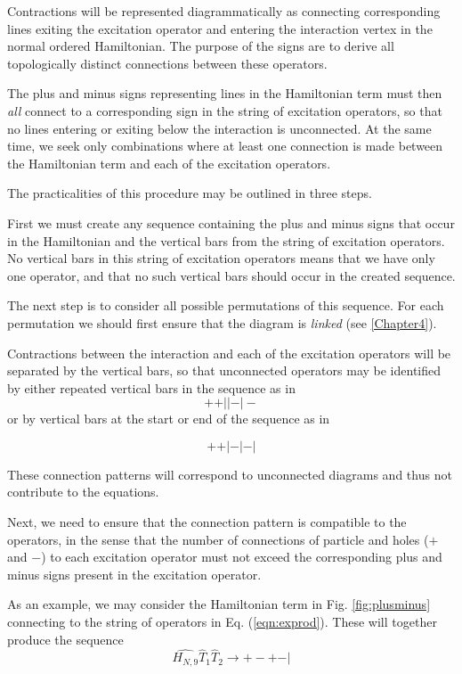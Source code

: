 Contractions will be represented diagrammatically as connecting
corresponding lines exiting the excitation operator and entering the
interaction vertex in the normal ordered Hamiltonian. The purpose of
the signs are to derive all topologically distinct connections between
these operators.

The plus and minus signs representing lines in the Hamiltonian term
must then \emph{all} connect to a corresponding sign in the string of
excitation operators, so that no lines entering or exiting below the
interaction is unconnected. At the same time, we seek only
combinations where at least one connection is made between the
Hamiltonian term and each of the excitation operators.

The practicalities of this procedure may be outlined in three steps.

First we must create any sequence containing the plus and minus signs
that occur in the Hamiltonian and the vertical bars from the string of
excitation operators. No vertical bars in this string of excitation operators means that we have only one operator, and that no such vertical bars should occur in the created sequence.

The next step is to consider all possible permutations of this
sequence. For each permutation we should first ensure that the diagram is \emph{linked} (see \ref{Chapter4}).

Contractions between the interaction and each of the excitation operators will be separated by
the vertical bars, so that unconnected operators may be identified by
either repeated vertical bars in the sequence as in
\begin{equation}
+ + \vert \vert - \vert -
\end{equation}
or by vertical bars at the start or end of the sequence as in

\begin{equation}
+ + \vert -\vert - \vert
\end{equation}

These connection patterns will correspond to unconnected diagrams and thus not contribute to the equations. 

Next, we need to ensure that the connection pattern is compatible to the operators, in the sense that the number
of connections of particle and holes ($+$ and $-$) to each excitation
operator must not exceed the corresponding plus and minus signs
present in the excitation operator.

As an example, we may consider the Hamiltonian term in Fig.
\ref{fig:plusminus} connecting to the string of operators in Eq.
(\ref{eqn:exprod}). These will together produce the sequence
\begin{equation}
\hat{H_{N,9}} \hat{T}_1 \hat{T}_2 \rightarrow  + - + - \vert 
\end{equation}

